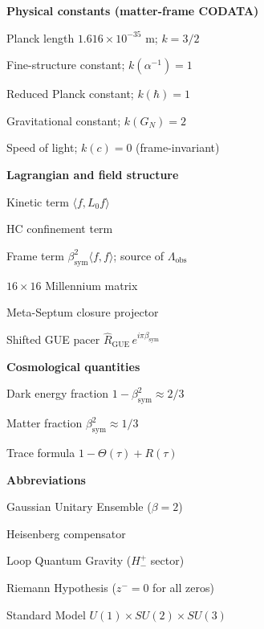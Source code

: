 \documentclass[12pt,a4paper]{article}
\newcommand{\bsym}{\beta_{\mathrm{sym}}}
\newcommand{\lP}{\ell_P}
\newcommand{\Hplusminus}{H^+_-}
\begin{document}
\hfill
\begin{minipage}[t]{0.48\textwidth}
\small
\noindent\textbf{Physical constants (matter-frame CODATA)}
\begin{description}[leftmargin=1.8em, labelindent=0pt, itemsep=1pt]
  \item[$\lP$] Planck length $1.616\times10^{-35}$ m; $k=3/2$
  \item[$\alpha$] Fine-structure constant; $k(\alpha^{-1})=1$
  \item[$\hbar$] Reduced Planck constant; $k(\hbar)=1$
  \item[$G_N$] Gravitational constant; $k(G_N)=2$
  \item[$c$] Speed of light; $k(c)=0$ (frame-invariant)
\end{description}

\medskip
\noindent\textbf{Lagrangian and field structure}
\begin{description}[leftmargin=1.8em, labelindent=0pt, itemsep=1pt]
  \item[$\mathcal{L}_{\mathrm{kin}}$] Kinetic term $\langle f,L_0 f\rangle$
  \item[$\mathcal{L}_{\mathrm{HC}}$] HC confinement term
  \item[$\mathcal{L}_{\mathrm{frame}}$] Frame term $\bsym^2\langle f,f\rangle$; source of $\Lambda_{\mathrm{obs}}$
  \item[$\mathcal{M}_{16}$] $16\times16$ Millennium matrix
  \item[$\hat P_{C_7}$] Meta-Septum closure projector
  \item[$\hat{\mathcal{R}}_\beta$] Shifted GUE pacer $\hat R_{\mathrm{GUE}}\,e^{i\pi\bsym}$
\end{description}

\medskip
\noindent\textbf{Cosmological quantities}
\begin{description}[leftmargin=1.8em, labelindent=0pt, itemsep=1pt]
  \item[$\Omega_\Lambda$] Dark energy fraction $1-\bsym^2\approx 2/3$
  \item[$\Omega_M$] Matter fraction $\bsym^2\approx 1/3$
  \item[$\Sigma(\tau)$] Trace formula $1-\Theta(\tau)+R(\tau)$
\end{description}

\medskip
\noindent\textbf{Abbreviations}
\begin{description}[leftmargin=1.8em, labelindent=0pt, itemsep=1pt]
  \item[GUE] Gaussian Unitary Ensemble ($\beta=2$)
  \item[HC] Heisenberg compensator
  \item[LQG] Loop Quantum Gravity ($\Hplusminus$ sector)
  \item[RH] Riemann Hypothesis ($z^-=0$ for all zeros)
  \item[SM] Standard Model $U(1)\times SU(2)\times SU(3)$
\end{description}
\end{minipage}
\end{document}
